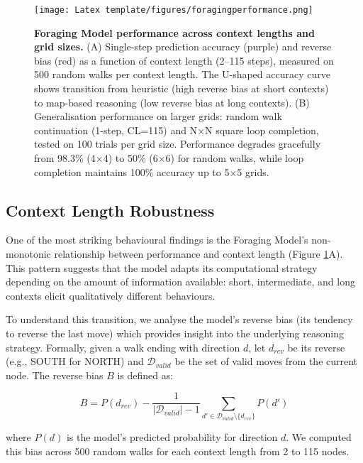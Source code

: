 \begin{figure}[h]
\centering
\texttt{[image: Latex template/figures/foragingperformance.png]}
\caption[Foraging Model performance across context lengths and grid sizes.]{\textbf{Foraging Model performance across context lengths and grid sizes.} (A) Single-step prediction accuracy (purple) and reverse bias (red) as a function of context length (2--115 steps), measured on 500 random walks per context length. The U-shaped accuracy curve shows transition from heuristic (high reverse bias at short contexts) to map-based reasoning (low reverse bias at long contexts). (B) Generalisation performance on larger grids: random walk continuation (1-step, CL=115) and N$\times$N square loop completion, tested on 100 trials per grid size. Performance degrades gracefully from 98.3\% (4$\times$4) to 50\% (6$\times$6) for random walks, while loop completion maintains 100\% accuracy up to 5$\times$5 grids.}
\label{fig:foraging_performance_profile}
\end{figure}

\subsection{Context Length Robustness}

One of the most striking behavioural findings is the Foraging Model's non-monotonic relationship between performance and context length (Figure \ref{fig:foraging_performance_profile}A). This pattern suggests that the model adapts its computational strategy depending on the amount of information available: short, intermediate, and long contexts elicit qualitatively different behaviours. 

To understand this transition, we analyse the model's reverse bias (its tendency to reverse the last move) which provides insight into the underlying reasoning strategy. Formally, given a walk ending with direction $d$, let $d_{rev}$ be its reverse (e.g., SOUTH for NORTH) and $\mathcal{D}_{valid}$ be the set of valid moves from the current node. The reverse bias $B$ is defined as:

\begin{equation}
B = P(d_{rev}) - \frac{1}{|\mathcal{D}_{valid}| - 1} \sum_{d' \in \mathcal{D}_{valid} \setminus \{d_{rev}\}} P(d')
\end{equation}

where $P(d)$ is the model's predicted probability for direction $d$. We computed this bias across 500 random walks for each context length from 2 to 115 nodes.


